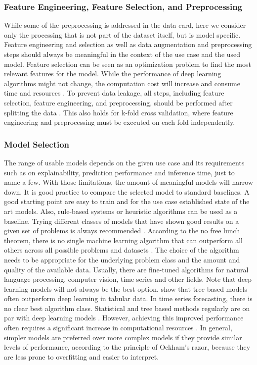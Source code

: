 \subsubsection{Feature Engineering, Feature Selection, and Preprocessing}
While some of the preprocessing is addressed in the data card, here we consider only the processing that is not part of the dataset itself, but is model specific. Feature engineering and selection as well as data augmentation and preprocessing steps should always be meaningful in the context of the use case and the used model. Feature selection can be seen as an optimization problem to find the most relevant features for the model. While the performance of deep learning algorithms might not change, the computation cost will increase and consume time and resources \citep{cai2018_featureSelection}. To prevent data leakage, all steps, including feature selection, feature engineering, and preprocessing, should be performed after splitting the data \citep{Kapoor22_LeakageAndReproducibility, reunanen2003variableselection}. This also holds for k-fold cross validation, where feature engineering and preprocessing must be executed on each fold independently.

\subsubsection{Model Selection}
The range of usable models depends on the given use case and its requirements such as on explainability, prediction performance and inference time, just to name a few. With those limitations, the amount of meaningful models will narrow down. It is good practice to compare the selected model to standard baselines. A good starting point are easy to train  and for the use case established state of the art models. Also, rule-based systems or heuristic algorithms can be used as a baseline. Trying different classes of models that have shown good results on a given set of problems is always recommended \citep{Lones2021_AvoidMLPitfalls, ding2018model}. According to the no free lunch theorem, there is no single machine learning algorithm that can outperform all others across all possible problems and datasets \citep{wolpert2002supervised}.
The choice of the algorithm needs to be appropriate for the underlying problem class and the amount and quality of the available data. Usually, there are fine-tuned algorithms for  natural language processing, computer vision, time series and other fields. Note that deep learning models will not always be the best option. \cite{grinsztajn2022tree} show that tree based models often outperform deep learning in tabular data. In time series forecasting, there is no clear best algorithm class. Statistical and tree based methods regularly are on par with deep learning models  \citep{zeng2022transformers}. However, achieving this improved performance often requires a significant increase in computational resources \citep{makridakis2023statistical}. In general, simpler models are preferred over more complex models if they provide similar levels of performance, according to the principle of Ockham's razor, because they are less prone to overfitting and easier to interpret.

